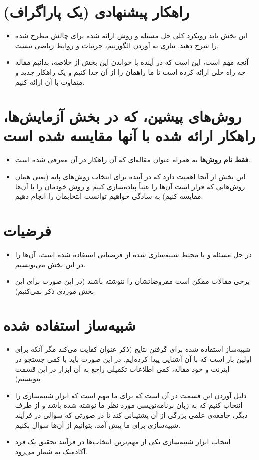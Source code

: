 \documentclass[a4paper,11pt]{article}
\newcommand*\tick{\item[\Checkmark]}
\begin{document}
    \section{راهکار پیشنهادی (یک پاراگراف)}\label{sec:prior-major-works}

      \begin{itemize}
        \tick {این بخش باید رویکرد کلی حل مسئله و روش ارائه شده برای چالش مطرح شده را شرح دهید. نیازی به آوردن الگوریتم، جزئیات و روابط ریاضی نیست.}
         \tick {آنچه مهم است، این است که در آینده با خواندن این بخش از خلاصه، بدانیم مقاله  چه راه حلی ارائه کرده است تا ما راهمان را از آن جدا کنیم و یک راهکار جدید و متفاوت با آن ارائه کنیم.}
    \end{itemize}

    \section{روش‌های پیشین، که در بخش آزمایش‌ها، راهکار ارائه شده با آنها مقایسه شده است}\label{sec:assumptions}
    \begin{itemize}
        \tick {\textbf{ فقط نام روش‌ها} به همراه عنوان مقاله‌ای که آن راهکار در آن معرفی شده است.}
        \tick {این بخش از آنجا اهمیت دارد که در آینده برای انتخاب روش‌های پایه (یعنی همان روش‌هایی که قرار است آن‌ها را عیناً پیاده‌سازی کنیم و روش خودمان را با آن‌ها مقایسه کنیم) به سادگی خواهیم توانست انتخابمان را انجام دهیم.}
    \end{itemize}

    \section{فرضیات}\label{sec:evaluation}

      \begin{itemize}
        \tick { در حل مسئله و یا محیط شبیه‌سازی شده از فرضیاتی استفاده شده است، آن‌ها را در این بخش می‌نویسیم.}
        \tick {برخی مقالات ممکن است مفروضاتشان را ننوشته باشند (در این صورت برای این بخش موردی ذکر نمی‌کنیم)}
    \end{itemize}

    \section{شبیه‌ساز استفاده شده }\label{sec:limitations}

  \begin{itemize}
        \tick { شبیه‌ساز استفاده شده برای گرفتن نتایج (ذکر عنوان کفایت می‌کند مگر آنکه برای اولین بار است که با آن آشنایی پیدا کرده‌ایم. در این صورت باید با کمی جستجو در ایترنت و خود مقاله، کمی اطلاعات تکمیلی راجع به آن ابزار در این قسمت بنویسیم)}
      \tick {دلیل آوردن این قسمت در آن است که برای ما مهم است که ابزار شبیه‌سازی را انتخاب کنیم که به زبان برنامه‌نویسی مورد نظر ما نوشته شده باشد و از طرف دیگر، جامعه‌ی علمی بزرگی از آن پشتیبانی کند تا در صورتی که سوالی در فرآیند شبیه‌سازی برای ما پیش آمد، بتوانیم از آن‌ها سوال بکنیم. }
   \tick{انتخاب ابزار شبیه‌سازی یکی از مهم‌ترین انتخاب‌ها در فرآیند تحقیق یک فرد آکادمیک به شمار می‌رود.}
    \end{itemize}
\end{document}
